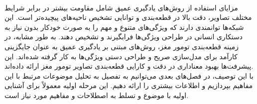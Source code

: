 \\
مزایای استفاده از روش‌های یادگیری عمیق شامل مقاومت بیشتر در برابر شرایط مختلف تصاویر، دقت بالا در قطعه‌بندی و توانایی تشخیص ناحیه‌های پیچیده‌تر است. این شبکه‌ها توانمندی دارند که ویژگی‌های متنوع و مهم را به صورت خودکار بدون نیاز به دستکاری انسانی در طراحی ویژگی‌ها فرابگیرند و تشخیص دهند. به طور مشابه، در زمینه قطعه‌بندی تومور مغز، روش‌های مبتنی بر یادگیری عمیق به عنوان جایگزینی کارآمد برای مدل‌سازی صریح و طراحی دستی ویژگی‌ها به کار گرفته شده‌اند. این پیشرفت‌ها بهبود معناداری در دقت و کارایی قطعه‌بندی تصاویر تومور مغز ارائه داده‌اند\cite{you2022eg}.
\\
با این توصیف، در فصل‌های بعدی می‌توانیم به تفصیل به تحلیل موضوعات مرتبط با این مفاهیم بپردازیم و اطلاعات بیشتری را ارائه دهیم. این مرحله اولیه معمولاً برای آشنایی اولیه با موضوع و تسلط به اصطلاحات و مفاهیم مورد نیاز است.

